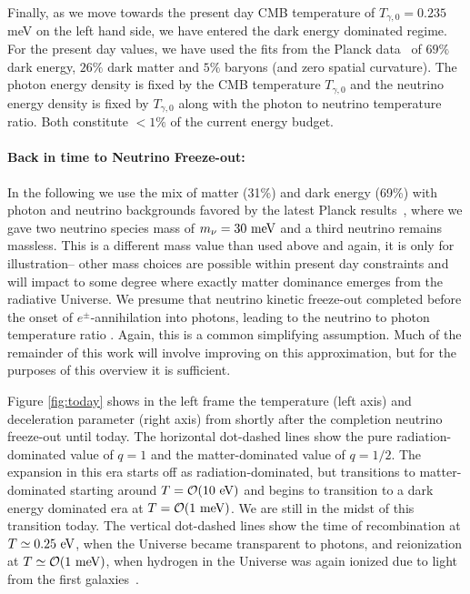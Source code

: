Finally, as we move towards the present day CMB temperature of $T_{\gamma,0}=0.235$ meV on the left hand side, we have entered the dark energy dominated regime. For the present day values, we have used the fits from the Planck data~\cite{Planck:2018vyg,Planck:2015fie,Planck:2013pxb} of $69\%$ dark energy, $26\%$ dark matter and $5\%$ baryons (and zero spatial curvature). The photon energy density is fixed by the CMB temperature $T_{\gamma,0}$ and the neutrino energy density is fixed by $T_{\gamma,0}$ along with the photon to neutrino temperature ratio. Both constitute $<1\%$ of the current energy budget.

\paragraph{Back in time to Neutrino Freeze-out:}
In the following we use the mix of matter (31\%) and dark energy (69\%) with photon and neutrino backgrounds favored by the latest Planck results~\cite{Planck:2018vyg,Planck:2015fie,Planck:2013pxb}, where we gave two neutrino species mass of $m_\nu=30\text{ meV}$ and a third neutrino remains massless. This is a different mass value than used above and again, it is only for illustration-- other mass choices are possible within present day constraints and will impact to some degree where exactly matter dominance emerges from the radiative Universe. We presume that neutrino kinetic freeze-out completed before the onset of $e^\pm$-annihilation into photons, leading to the neutrino to photon temperature ratio . Again, this is a common simplifying assumption. Much of the remainder of this work will involve improving on this approximation, but for the purposes of this overview it is sufficient.

Figure \ref{fig:today} shows in the left frame the temperature (left axis) and deceleration parameter (right axis) from shortly after the completion neutrino freeze-out until today. The horizontal dot-dashed lines show the pure radiation-dominated value of $q=1$ and the matter-dominated value of $q=1/2$. The expansion in this era starts off as radiation-dominated, but transitions to matter-dominated starting around $T=\mathcal{O}(10\text{ eV})$ and begins to transition to a dark energy dominated era at $T=\mathcal{O}(1\text{ meV})$. We are still in the midst of this transition today. The vertical dot-dashed lines show the time of recombination at $T\simeq0.25\text{ eV}$, when the Universe became transparent to photons, and reionization at $T\simeq {\cal O}(1\meV)$, when hydrogen in the Universe was again ionized due to light from the first galaxies~\cite{Zaroubi:2012in}. 

